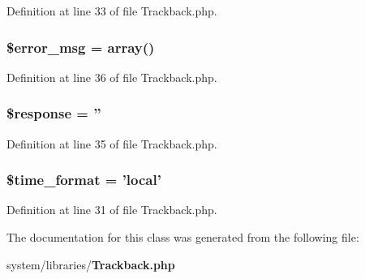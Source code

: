 Definition at line 33 of file Trackback.\-php.

\subsubsection[{\$error\-\_\-msg}]{\setlength{\rightskip}{0pt plus 5cm}\$error\-\_\-msg = array()}\label{class_c_i___trackback_acf910733622c1fa671b9f755c69c2ec7}


Definition at line 36 of file Trackback.\-php.

\subsubsection[{\$response}]{\setlength{\rightskip}{0pt plus 5cm}\$response = ''}\label{class_c_i___trackback_af4b6fb1bbc77ccc05f10da3b16935b99}


Definition at line 35 of file Trackback.\-php.

\subsubsection[{\$time\-\_\-format}]{\setlength{\rightskip}{0pt plus 5cm}\$time\-\_\-format = 'local'}\label{class_c_i___trackback_a96745a88c8a49f8ed93ec24fa13619cb}


Definition at line 31 of file Trackback.\-php.



The documentation for this class was generated from the following file\-:\begin{DoxyCompactItemize}
\item 
system/libraries/{\bf Trackback.\-php}\end{DoxyCompactItemize}
